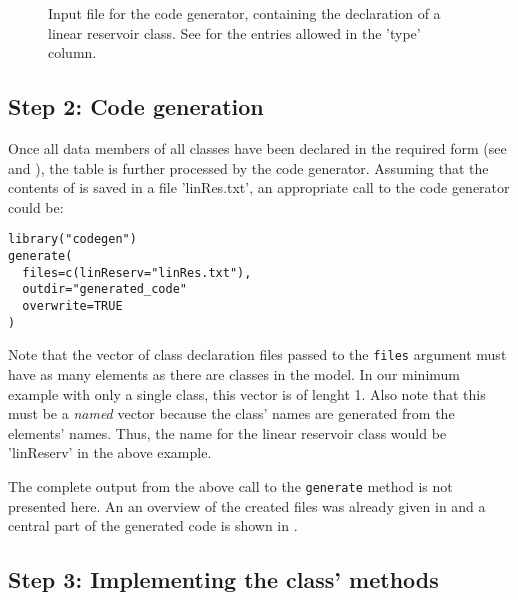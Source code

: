 \begin{figure}[htb]
  
  \caption[Input file for the code generator, containing the declaration of a linear reservoir class.]{Input file for the code generator, containing the declaration of a linear reservoir class. See  for the entries allowed in the 'type' column. \label{fig:concept-classDef-declaration-example}}
\end{figure}

\subsection{Step 2: Code generation} \label{sec:concept-classDef-codegen}

Once all data members of all classes have been declared in the required form (see  and ), the table is further processed by the code generator. Assuming that the contents of  is saved in a file 'linRes.txt', an appropriate call to the code generator could be:

\begin{lstlisting}[style=R]
library("codegen")
generate(
  files=c(linReserv="linRes.txt"),
  outdir="generated_code"
  overwrite=TRUE
)
\end{lstlisting}

Note that the vector of class declaration files passed to the \texttt{files} argument must have as many elements as there are classes in the model. In our minimum example with only a single class, this vector is of lenght 1. Also note that this must be a \emph{named} vector because the class' names are generated from the elements' names. Thus, the name for the linear reservoir class would be 'linReserv' in the above example.

The complete output from the above call to the \texttt{generate} method is not presented here. An an overview of the created files was already given in  and a central part of the generated code is shown in .

\subsection{Step 3: Implementing the class' methods} \label{sec:concept-classDef-simulate}

